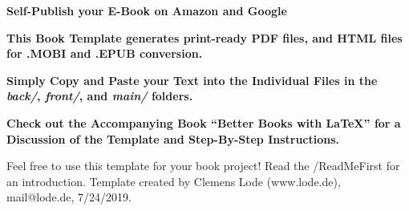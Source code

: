 

\thispagestyle{empty}

	\begin{center}

  \bfseries \sffamily \Huge Self-Publish your E-Book on Amazon and Google\par
	\bfseries \LARGE This Book Template generates print-ready PDF files, and HTML files for .MOBI and .EPUB conversion.\par
    \bfseries \LARGE Simply Copy and Paste your Text into the Individual Files in the \textit{back/}, \textit{front/}, and \textit{main/} folders.\par
    \bfseries \LARGE Check out the Accompanying Book ``Better Books with LaTeX'' for a Discussion of the Template and Step-By-Step Instructions.\par
    \Large Feel free to use this template for your book project! Read the /ReadMeFirst for an introduction. Template created by Clemens Lode (www.lode.de), mail@lode.de, 7/24/2019.
	\end{center}

